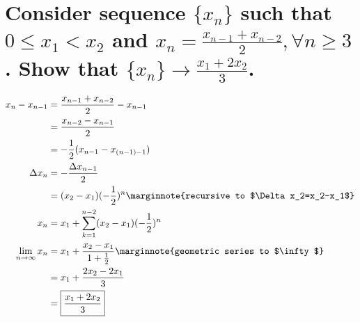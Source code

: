 \documentclass[letterpaper]{article}
\begin{document}
\section{Consider sequence $\{x_n\}$ such that $0\leq x_1<x_2$ and $x_n=\frac{x_{n-1}+x_{n-2}}{2},\forall n\geq3$. Show that $\{x_n\}\rightarrow\frac{x_1+2x_2}{3}$.}
\begin{align*}	
x_n-x_{n-1}&=\frac{x_{n-1}+x_{n-2}}{2}-x_{n-1} \\
&=\frac{x_{n-2}-x_{n-1}}{2} \\
&=-\frac{1}{2}(x_{n-1}-x_{(n-1)-1}) \\
\Delta x_n&=-\frac{\Delta x_{n-1}}{2} \\
&=(x_2-x_1)(-\frac{1}{2})^n \marginnote{recursive to $\Delta x_2=x_2-x_1$} \\
x_n&=x_1+\sum_{k=1}^{n-2}(x_2-x_1)(-\frac{1}{2})^n \\
\lim_{n\rightarrow\infty}x_n&=x_1+\frac{x_2-x_1}{1+\frac{1}{2}} \marginnote{geometric series to $\infty$} \\
&=x_1+\frac{2x_2-2x_1}{3} \\
&=\boxed{\frac{x_1+2x_2}{3}}
\end{align*}
\end{document}
